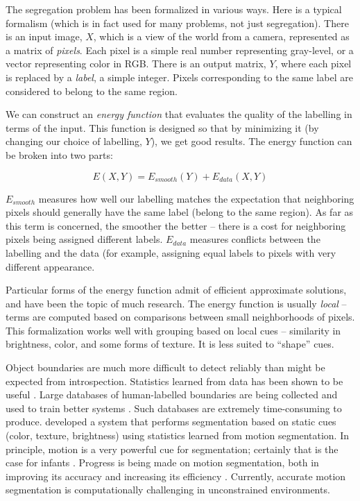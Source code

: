 The segregation problem has been formalized in various ways.  Here is
a typical formalism (which is in fact used for many problems, not just
segregation).  There is an input image, $X$, which is a view of the
world from a camera, represented as a matrix of {\em pixels}.  Each
pixel is a simple real number representing gray-level, or a vector
representing color in RGB.
%
There is an output matrix, $Y$, where each pixel is replaced by
a {\em label}, a simple integer.  Pixels corresponding to the 
same label are considered to belong to the same region.

We can construct an {\em energy function} that evaluates the quality
of the labelling in terms of the input.  This function is designed so
that by minimizing it (by changing our choice of labelling, $Y$), we
get good results.  The energy function can be broken into two
parts:

\begin{displaymath}
%
E(X,Y) = E_{smooth}(Y) + E_{data}(X,Y)
%
\end{displaymath}

$E_{smooth}$ measures how well our labelling matches the
expectation that neighboring pixels should generally have the
same label (belong to the same region).
As far as this term is concerned, the smoother the better -- there is
a cost for neighboring pixels being assigned different labels.
$E_{data}$ measures conflicts between the labelling and the data (for
example, assigning equal labels to pixels with very different
appearance.

Particular forms of the energy function admit of efficient 
approximate solutions, and have been the topic of much research.
%
The energy function is usually {\em local} -- terms are computed 
based on comparisons between small neighborhoods of pixels.
%
This formalization works well with grouping based on local
cues -- similarity in brightness, color, and some forms of texture.
It is less suited to ``shape'' cues.


Object boundaries are much more difficult to detect reliably than might be 
expected from introspection.
Statistics learned from data has been shown to be useful
\cite{konishi03statistical}.  Large databases of 
human-labelled boundaries are being collected and
used to train better systems
\cite{martin04learning}.
%
Such databases are extremely time-consuming to produce.
%
 developed a system that performs
segmentation based on static cues (color, texture, brightness)
using statistics learned from motion segmentation.
In principle, motion is a very powerful cue for
segmentation; certainly that is the case for infants
\cite{kellman93kinematic}.
%
Progress is being made on motion segmentation, both 
in improving its accuracy and increasing its efficiency
 \cite{cremers05motion,fowlkes04spectral,smith03motion,smith04layered}.
%
Currently, accurate motion segmentation is 
computationally challenging in unconstrained environments.


